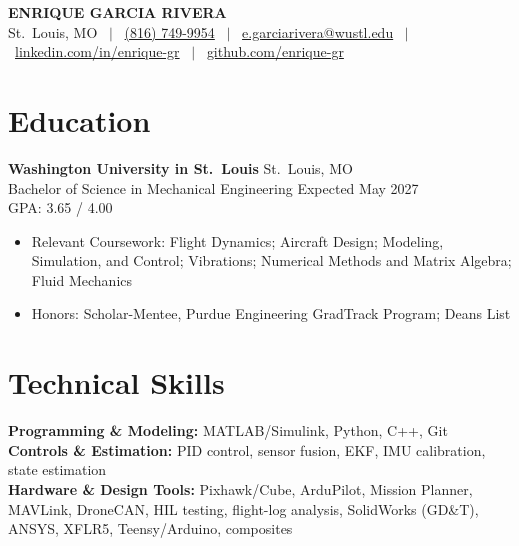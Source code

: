 \documentclass[11pt, letterpaper]{article}
\newcommand{\myphone}{(816) 749-9954}
\begin{document}
\begin{center}
{\fontsize{18pt}{22pt}\selectfont\bfseries ENRIQUE GARCIA RIVERA} \\[4pt]
\small
St.\ Louis, MO \ $|$ \ \href{tel:+18167499954}{\myphone} \ $|$ \
\href{mailto:e.garciarivera@wustl.edu}{e.garciarivera@wustl.edu} \ $|$ \
\href{https://www.linkedin.com/in/enrique-gr}{linkedin.com/in/enrique-gr} \ $|$ \
\href{https://github.com/enrique-gr}{github.com/enrique-gr}
\end{center}
\section{Education}
\textbf{Washington University in St.\ Louis} \hfill St.\ Louis, MO \\
Bachelor of Science in Mechanical Engineering \hfill Expected May 2027 \\
GPA: 3.65 / 4.00
\begin{itemize}
\item Relevant Coursework: Flight Dynamics; Aircraft Design; Modeling, Simulation, and Control; Vibrations; Numerical Methods and Matrix Algebra; Fluid Mechanics
\item Honors: Scholar-Mentee, Purdue Engineering GradTrack Program; Deans List
\end{itemize}
\section{Technical Skills}
\textbf{Programming \& Modeling:} MATLAB/Simulink, Python, C++, Git \\
\textbf{Controls \& Estimation:} PID control, sensor fusion, EKF, IMU calibration, state estimation \\
\textbf{Hardware \& Design Tools:} Pixhawk/Cube, ArduPilot, Mission Planner, MAVLink, DroneCAN, HIL testing, flight-log analysis, SolidWorks (GD\&T), ANSYS, XFLR5, Teensy/Arduino, composites
\end{document}
